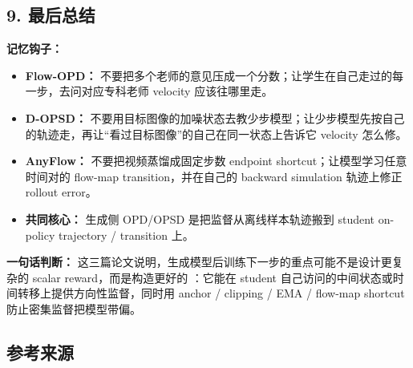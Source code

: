 \subsection{9. 最后总结}

\begin{intubox}
\textbf{记忆钩子：}
\begin{itemize}[leftmargin=1.5em]
  \item \textbf{Flow-OPD：} 不要把多个老师的意见压成一个分数；让学生在自己走过的每一步，去问对应专科老师 velocity 应该往哪里走。
  \item \textbf{D-OPSD：} 不要用目标图像的加噪状态去教少步模型；让少步模型先按自己的轨迹走，再让“看过目标图像”的自己在同一状态上告诉它 velocity 怎么修。
  \item \textbf{AnyFlow：} 不要把视频蒸馏成固定步数 endpoint shortcut；让模型学习任意时间对的 flow-map transition，并在自己的 backward simulation 轨迹上修正 rollout error。
  \item \textbf{共同核心：} 生成侧 OPD/OPSD 是把监督从离线样本轨迹搬到 student on-policy trajectory / transition 上。
\end{itemize}
\end{intubox}

\begin{summarybox}
\textbf{一句话判断：} 这三篇论文说明，生成模型后训练下一步的重点可能不是设计更复杂的 scalar reward，而是构造更好的 ：它能在 student 自己访问的中间状态或时间转移上提供方向性监督，同时用 anchor / clipping / EMA / flow-map shortcut 防止密集监督把模型带偏。
\end{summarybox}

\subsection{参考来源}

